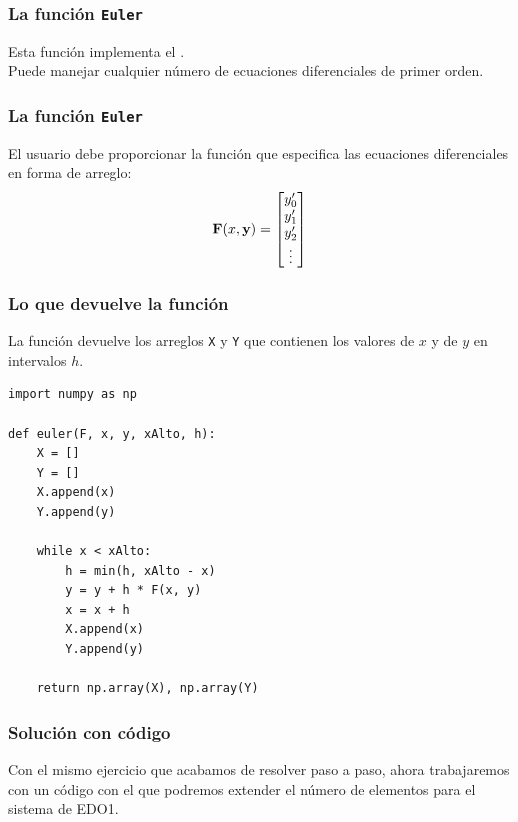 \documentclass[12pt]{beamer}
\begin{document}
\begin{frame}
\frametitle{La función \texttt{Euler}}
Esta función implementa el .
\\
\bigskip
\pause
Puede manejar cualquier número de ecuaciones diferenciales de primer orden.
\end{frame}
\begin{frame}
\frametitle{La función \texttt{Euler}}
El usuario debe proporcionar la función  que especifica las ecuaciones diferenciales en forma de arreglo:
\pause
\renewcommand*{\arraystretch}{0.7}
\begin{align*}
\mathbf{F} (x, \mathbf{y}) = 
\begin{bmatrix}
{y}^{\prime}_{0} \\
{y}^{\prime}_{1} \\
{y}^{\prime}_{2} \\
\vdots
\end{bmatrix}
\end{align*}
\end{frame}
\begin{frame}
\frametitle{Lo que devuelve la función}
La función devuelve los arreglos \texttt{X} y \texttt{Y} que contienen los valores de $x$ y de $y$ en intervalos $h$.
\end{frame}
\begin{frame}
\begin{lstlisting}[caption=Método de Euler]
import numpy as np

def euler(F, x, y, xAlto, h):
    X = []
    Y = []
    X.append(x)
    Y.append(y)

    while x < xAlto:
        h = min(h, xAlto - x)
        y = y + h * F(x, y)
        x = x + h
        X.append(x)
        Y.append(y)

    return np.array(X), np.array(Y)
\end{lstlisting}
\end{frame}
\begin{frame}
\frametitle{Solución con código}
Con el mismo ejercicio que acabamos de resolver paso a paso, ahora trabajaremos con un código con el que podremos extender el número de elementos para el sistema de EDO1.
\end{frame}
\end{document}
